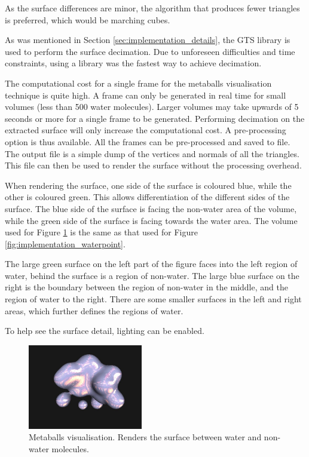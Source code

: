 As the surface differences are minor, the algorithm that produces fewer
triangles is preferred, which would be marching cubes.



As was mentioned in Section \ref{sec:implementation_details}, the GTS library
is used to perform the surface decimation. Due to unforeseen difficulties and
time constraints, using a library was the fastest way to achieve decimation.

The computational cost for a single frame for the metaballs visualisation
technique is quite high. A frame can only be generated in real time for small
volumes (less than 500 water molecules). Larger volumes may take upwards of 5
seconds or more for a single frame to be generated. Performing decimation on
the extracted surface will only increase the computational cost. A
pre-processing option is thus available. All the frames can be pre-processed
and saved to file. The output file is a simple dump of the vertices and normals
of all the triangles. This file can then be used to render the surface without
the processing overhead.

When rendering the surface, one side of the surface is coloured blue, while the
other is coloured green. This allows differentiation of the different sides of
the surface. The blue side of the surface is facing the non-water area of the
volume, while the green side of the surface is facing towards the water area.
The volume used for Figure \ref{fig:implementation_metaballs} is the same as
that used for Figure \ref{fig:implementation_waterpoint}.

The large green surface on the left part of the figure faces into the left
region of water, behind the surface is a region of non-water. The large blue
surface on the right is the boundary between the region of non-water in the
middle, and the region of water to the right. There are some smaller surfaces
in the left and right areas, which further defines the regions of water.

To help see the surface detail, lighting can be enabled.

\begin{figure}
  \begin{center}
    \includegraphics[width=50mm]{metaballs}
  \end{center}
  \caption{Metaballs visualisation. Renders the surface between water and
  non-water molecules.}
  \label{fig:implementation_metaballs}
\end{figure}

